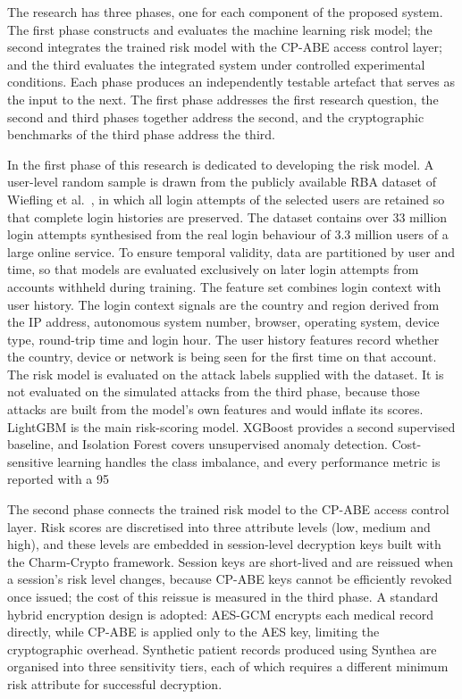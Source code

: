 The research has three phases, one for each component of the proposed system. The first phase constructs and evaluates the machine learning risk model; the second integrates the trained risk model with the CP-ABE access control layer; and the third evaluates the integrated system under controlled experimental conditions. Each phase produces an independently testable artefact that serves as the input to the next. The first phase addresses the first research question, the second and third phases together address the second, and the cryptographic benchmarks of the third phase address the third.

In the first phase of this research is dedicated to developing the risk model. A user-level random sample is drawn from the publicly available RBA dataset of Wiefling et al.~\cite{wiefling2023pump}, in which all login attempts of the selected users are retained so that complete login histories are preserved. The dataset contains over 33 million login attempts synthesised from the real login behaviour of 3.3 million users of a large online service. To ensure temporal validity, data are partitioned by user and time, so that models are evaluated exclusively on later login attempts from accounts withheld during training. The feature set combines login context with user history. The login context signals are the country and region derived from the IP address, autonomous system number, browser, operating system, device type, round-trip time and login hour. The user history features record whether the country, device or network is being seen for the first time on that account. The risk model is evaluated on the attack labels supplied with the dataset. It is not evaluated on the simulated attacks from the third phase, because those attacks are built from the model's own features and would inflate its scores. LightGBM is the main risk-scoring model. XGBoost provides a second supervised baseline, and Isolation Forest covers unsupervised anomaly detection. Cost-sensitive learning handles the class imbalance, and every performance metric is reported with a 95%

The second phase connects the trained risk model to the CP-ABE access control layer. Risk scores are discretised into three attribute levels (low, medium and high), and these levels are embedded in session-level decryption keys built with the Charm-Crypto framework. Session keys are short-lived and are reissued when a session's risk level changes, because CP-ABE keys cannot be efficiently revoked once issued; the cost of this reissue is measured in the third phase. A standard hybrid encryption design is adopted: AES-GCM encrypts each medical record directly, while CP-ABE is applied only to the AES key, limiting the cryptographic overhead. Synthetic patient records produced using Synthea are organised into three sensitivity tiers, each of which requires a different minimum risk attribute for successful decryption.

